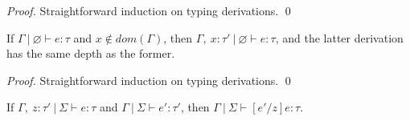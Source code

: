 \documentclass{llncs}
\begin{document}
\begin{proof}
Straightforward induction on typing derivations. \qed
\end{proof}

\vspace{8pt}

\begin{lemma}[Weakening]
If $\Gamma~|~\varnothing \vdash e : \tau$ and $x \not\in dom(\Gamma)$, then $\Gamma,~x : \tau'~|~\varnothing \vdash e : \tau$, and the latter derivation has the same depth as the former.
\end{lemma}

\begin{proof}
Straightforward induction on typing derivations. \qed
\end{proof}

\vspace{8pt}

\begin{lemma}
If $\Gamma,~z : \tau'~|~\Sigma \vdash e : \tau$ and $\Gamma~|~\Sigma \vdash e' : \tau'$, then $\Gamma~|~\Sigma \vdash [e'/z]e : \tau$.
\end{lemma}
\end{document}
